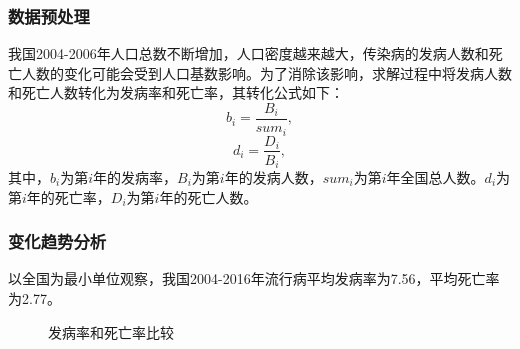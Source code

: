 \documentclass{whutmod}
\begin{document}
\subsubsection{数据预处理}
我国2004-2006年人口总数不断增加，人口密度越来越大，传染病的发病人数和死亡人数的变化可能会受到人口基数影响。为了消除该影响，求解过程中将发病人数和死亡人数转化为发病率和死亡率，其转化公式如下：
\begin{equation}
    b_i=\frac{B_i}{sum_i},
\end{equation}
\begin{equation}
    d_i=\frac{D_i}{B_i},
\end{equation}
其中，$b_i$为第$i$年的发病率，$B_i$为第$i$年的发病人数，$sum_i$为第$i$年全国总人数。$d_i$为第$i$年的死亡率，$D_i$为第$i$年的死亡人数。

\subsubsection{变化趋势分析}
以全国为最小单位观察，我国2004-2016年流行病平均发病率为7.56\textperthousand，平均死亡率为2.77\textperthousand。
\begin{figure}[H]
    \centering
    \centering
    \caption{发病率和死亡率比较}
\end{figure}
\end{document}
